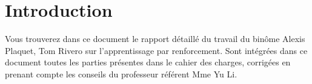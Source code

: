 \chapter*{Introduction}
Vous trouverez dans ce document le rapport détaillé du travail du binôme Alexis Plaquet, Tom Rivero sur l'apprentissage par renforcement. Sont intégrées dans ce document toutes les parties présentes dans le cahier des charges, corrigées en prenant compte les conseils du professeur référent Mme Yu Li.